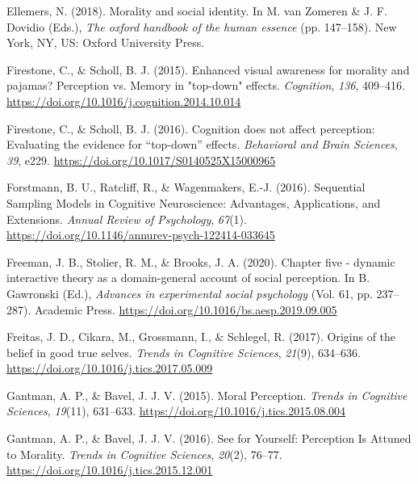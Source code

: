 \documentclass[
  man]{apa6}
\newlength{\cslhangindent}
\newlength{\cslentryspacingunit} %
\newenvironment{CSLReferences}[2] %
 {%
  \setlength{\parindent}{0pt}
  \ifodd #1
  \let\oldpar\par
  \def\par{\hangindent=\cslhangindent\oldpar}
  \fi
  \setlength{\parskip}{#2\cslentryspacingunit}
 }%
 {}
\begin{document}
\begin{CSLReferences}{1}{0}
\leavevmode{}%
Ellemers, N. (2018). Morality and social identity. In M. van Zomeren \& J. F. Dovidio (Eds.), \emph{The oxford handbook of the human essence} (pp. 147--158). New York, {NY}, {US}: Oxford University Press.

\leavevmode{}%
Firestone, C., \& Scholl, B. J. (2015). Enhanced visual awareness for morality and pajamas? Perception vs. Memory in "top-down" effects. \emph{Cognition}, \emph{136}, 409--416. \url{https://doi.org/10.1016/j.cognition.2014.10.014}

\leavevmode{}%
Firestone, C., \& Scholl, B. J. (2016). Cognition does not affect perception: {Evaluating} the evidence for {``top-down''} effects. \emph{Behavioral and Brain Sciences}, \emph{39}, e229. \url{https://doi.org/10.1017/S0140525X15000965}

\leavevmode{}%
Forstmann, B. U., Ratcliff, R., \& Wagenmakers, E.-J. (2016). Sequential {Sampling} {Models} in {Cognitive} {Neuroscience}: {Advantages}, {Applications}, and {Extensions}. \emph{Annual Review of Psychology}, \emph{67}(1). \url{https://doi.org/10.1146/annurev-psych-122414-033645}

\leavevmode{}%
Freeman, J. B., Stolier, R. M., \& Brooks, J. A. (2020). Chapter five - dynamic interactive theory as a domain-general account of social perception. In B. Gawronski (Ed.), \emph{Advances in experimental social psychology} (Vol. 61, pp. 237--287). Academic Press. \url{https://doi.org/10.1016/bs.aesp.2019.09.005}

\leavevmode{}%
Freitas, J. D., Cikara, M., Grossmann, I., \& Schlegel, R. (2017). Origins of the belief in good true selves. \emph{Trends in Cognitive Sciences}, \emph{21}(9), 634--636. \url{https://doi.org/10.1016/j.tics.2017.05.009}

\leavevmode{}%
Gantman, A. P., \& Bavel, J. J. V. (2015). Moral {Perception}. \emph{Trends in Cognitive Sciences}, \emph{19}(11), 631--633. \url{https://doi.org/10.1016/j.tics.2015.08.004}

\leavevmode{}%
Gantman, A. P., \& Bavel, J. J. V. (2016). See for {Yourself}: {Perception} {Is} {Attuned} to {Morality}. \emph{Trends in Cognitive Sciences}, \emph{20}(2), 76--77. \url{https://doi.org/10.1016/j.tics.2015.12.001}


\end{CSLReferences}
\end{document}
